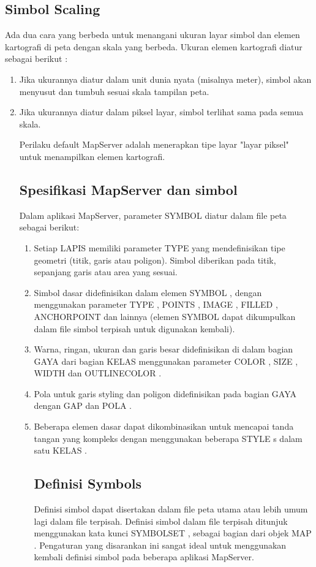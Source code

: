 \begin{enumerate}
\subsection {Simbol Scaling}
Ada dua cara yang berbeda untuk menangani ukuran layar simbol dan elemen kartografi di peta dengan skala yang berbeda. Ukuran elemen kartografi diatur sebagai berikut :
\begin{enumerate}
\item Jika ukurannya diatur dalam unit dunia nyata (misalnya meter), simbol akan menyusut dan tumbuh sesuai skala tampilan peta.
\item Jika ukurannya diatur dalam piksel layar, simbol terlihat sama pada semua skala.

Perilaku default MapServer adalah menerapkan tipe layar "layar piksel" untuk menampilkan elemen kartografi.

\subsection {Spesifikasi MapServer dan simbol}
Dalam aplikasi MapServer, parameter SYMBOL diatur dalam file peta sebagai berikut:
\begin{enumerate}
\item Setiap LAPIS memiliki parameter TYPE yang mendefinisikan tipe geometri (titik, garis atau poligon). Simbol diberikan pada titik, sepanjang garis atau area yang sesuai.
\item Simbol dasar didefinisikan dalam elemen SYMBOL , dengan menggunakan parameter TYPE , POINTS , IMAGE , FILLED , ANCHORPOINT dan lainnya (elemen SYMBOL dapat dikumpulkan dalam file simbol terpisah untuk digunakan kembali).
\item Warna, ringan, ukuran dan garis besar didefinisikan di dalam bagian GAYA dari bagian KELAS menggunakan parameter COLOR , SIZE , WIDTH dan OUTLINECOLOR .
\item Pola untuk garis styling dan poligon didefinisikan pada bagian GAYA dengan GAP dan POLA .
\item Beberapa elemen dasar dapat dikombinasikan untuk mencapai tanda tangan yang kompleks dengan menggunakan beberapa STYLE s dalam satu KELAS .

\subsection {Definisi Symbols}
    Definisi simbol dapat disertakan dalam file peta utama atau lebih umum lagi dalam file terpisah. Definisi simbol dalam file terpisah ditunjuk menggunakan kata kunci SYMBOLSET , sebagai bagian dari objek MAP . Pengaturan yang disarankan ini sangat ideal untuk menggunakan kembali definisi simbol pada beberapa aplikasi MapServer.


\end{enumerate}
\end{enumerate}
\end{enumerate}
